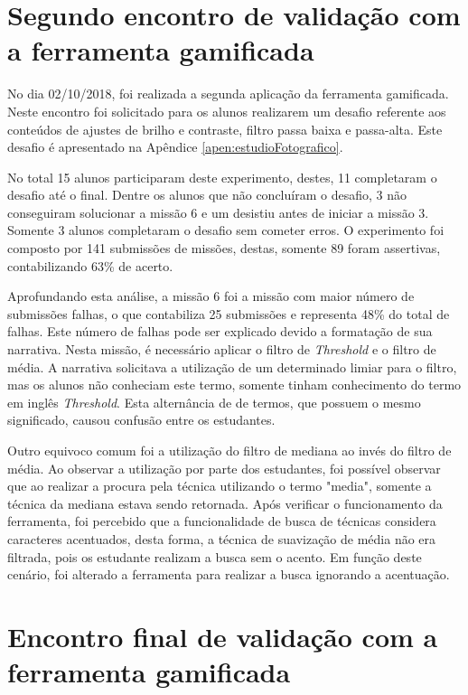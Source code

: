 \documentclass[
	12pt,				%
	oneside,			%
	a4paper,			%
	english,			%
	french,				%
	spanish,			%
	brazil,				%
	]{abntex2}
\begin{document}
\section{Segundo encontro de validação com a ferramenta gamificada}

No dia 02/10/2018, foi realizada a segunda aplicação da ferramenta gamificada. Neste encontro foi solicitado para os alunos realizarem um desafio referente aos conteúdos de ajustes de brilho e contraste, filtro passa baixa e passa-alta. Este desafio é apresentado na Apêndice \ref{apen:estudioFotografico}.

No total 15 alunos participaram deste experimento, destes, 11 completaram o desafio até o final. Dentre os alunos que não concluíram o desafio, 3 não conseguiram solucionar a missão 6 e um desistiu antes de iniciar a missão 3. Somente 3 alunos completaram o desafio sem cometer erros. O experimento foi composto por 141 submissões de missões, destas, somente 89 foram assertivas, contabilizando 63\% de acerto.

Aprofundando esta análise, a missão 6 foi a missão com maior número de submissões falhas, o que contabiliza 25 submissões e representa 48\% do total de falhas. Este número de falhas pode ser explicado devido a formatação de sua narrativa. Nesta missão, é necessário aplicar o filtro de \textit{Threshold} e o filtro de média. A narrativa solicitava a utilização de um determinado limiar para o filtro, mas os alunos não conheciam este termo, somente tinham conhecimento do termo em inglês \textit{Threshold}. Esta alternância de de termos, que possuem o mesmo significado, causou confusão entre os estudantes. 

Outro equivoco comum foi a utilização do filtro de mediana ao invés do filtro de média. Ao observar a utilização por parte dos estudantes, foi possível observar que ao realizar a procura pela técnica utilizando o termo "media", somente a técnica da mediana estava sendo retornada. Após verificar o funcionamento da ferramenta, foi percebido que a funcionalidade de busca de técnicas considera caracteres acentuados, desta forma, a técnica de suavização de média não era filtrada, pois os estudante realizam a busca sem o acento. Em função deste cenário, foi alterado a ferramenta para realizar a busca ignorando a acentuação. 

\section{Encontro final de validação com a ferramenta gamificada}
\label{sec:validacaoEncontroFinal}
\end{document}
